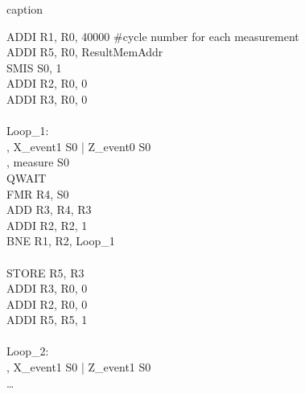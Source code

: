 \begin{algorithm}[ht]
      \caption{caption}
      \begin{ttfamily} 

      \textcolor[RGB]{0,0,205}{ADDI } \quad R1, R0, 40000   \qquad \textcolor[RGB]{169,169,169}{\#cycle number for each measurement}\\
      \textcolor[RGB]{0,0,205}{ADDI } \quad R5, R0, ResultMemAddr\\
      \textcolor[RGB]{0,0,205}{SMIS } \quad S0, 1\\
      \textcolor[RGB]{0,0,205}{ADDI } \quad R2, R0, 0\\
      \textcolor[RGB]{0,0,205}{ADDI } \quad R3, R0, 0\\
      ~\\
      \textcolor[RGB]{34,139,34}{Loop\_1:}\\ 
       , \textcolor[RGB]{139,69,19}{X\_event1} S0 | \textcolor[RGB]{139,69,19}{Z\_event0} S0\\
       , \textcolor[RGB]{139,69,19}{measure} S0\\
      \quad \textcolor[RGB]{0,0,205}{QWAIT} \\
      \quad \textcolor[RGB]{0,0,205}{FMR\quad} \quad R4, S0\\
      \quad \textcolor[RGB]{0,0,205}{ADD\quad} \quad R3, R4, R3\\
      \quad \textcolor[RGB]{0,0,205}{ADDI } \quad R2, R2, 1\\
      \quad \textcolor[RGB]{0,0,205}{BNE\quad} \quad R1, R2, \textcolor[RGB]{34,139,34}{Loop\_1}\\
      ~\\
      \textcolor[RGB]{0,0,205}{STORE} \quad R5, R3\\
      \textcolor[RGB]{0,0,205}{ADDI } \quad R3, R0, 0\\
      \textcolor[RGB]{0,0,205}{ADDI } \quad R2, R0, 0\\
      \textcolor[RGB]{0,0,205}{ADDI } \quad R5, R5, 1\\
      ~\\
      \textcolor[RGB]{34,139,34}{Loop\_2:}\\
       , \textcolor[RGB]{139,69,19}{X\_event1} S0 | \textcolor[RGB]{139,69,19}{Z\_event1} S0\\
      \dots

      
      \end{ttfamily} 
\end{algorithm} 

